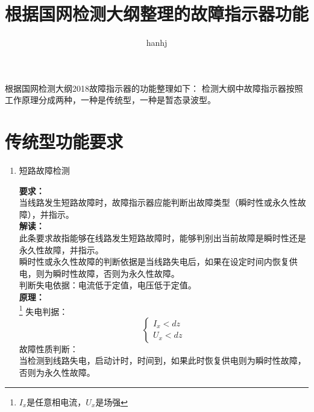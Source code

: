 \documentclass{article}
\begin{document}
\begin{CJK}{UTF8}{gbsn}
\title{根据国网检测大纲整理的故障指示器功能}
\author{hanhj}
\maketitle
根据国网检测大纲2018故障指示器的功能整理如下：
检测大纲中故障指示器按照工作原理分成两种，一种是传统型，一种是暂态录波型。
\section{传统型功能要求}
\begin{enumerate}
\item	短路故障检测
\par
	\textbf{要求：}\\当线路发生短路故障时，故障指示器应能判断出故障类型（瞬时性或永久性故障），并指示。\\
	\textbf{解读：}\\此条要求故指能够在线路发生短路故障时，能够判别出当前故障是瞬时性还是永久性故障，并指示。\\
	瞬时性或永久性故障的判断依据是当线路失电后，如果在设定时间内恢复供电，则为瞬时性故障，否则为永久性故障。\\
	判断失电依据：电流低于定值，电压低于定值。\\
	\textbf{原理：}\\
	\footnote{$I_x$是任意相电流，$U_x$是场强}
	失电判据：\\
	\[
		\left\{ 
			\begin{array}{ll}
				I_x<dz\\
				U_x<dz 
			\end{array}
		\right.
	\]
	故障性质判断：\\
		当检测到线路失电，启动计时，时间到，如果此时恢复供电则为瞬时性故障，否则为永久性故障。			


\end{enumerate}
\end{CJK}
\end{document}
